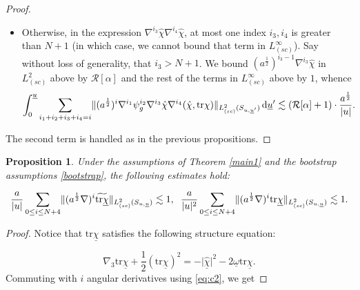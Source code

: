\documentclass{amsart}
\newtheorem{proposition}{Proposition}[section]
\newcommand{\aln}{(\al \nabla)^i}
\newcommand{\omegabar}{\underline{\omega}}
\newcommand{\dubarprime}{\hspace{.5mm} \text{d} \ubar^{\prime}}
\newcommand{\intubar}{\int_0^{\ubar}}
\newcommand{\chihat}{\hat{\chi}}
\newcommand{\al}{a^{\frac{1}{2}}}
\newcommand{\chibar}{\underline{\chi}}
\newcommand{\chibarhat}{\underline{\hat{\chi}}}
\newcommand{\ubar}{\underline{u}}
\newcommand{\scaleinfinitySu}[1]{\lVert{#1} \rVert_{L^\infty_{(sc)}(S_{u,\ubar})}}
\newcommand{\tildetr}{\widetilde{\tr \chibar}}
\newcommand{\scaletwoSu}[1]{\lVert{#1} \rVert_{L^2_{(sc)}(S_{u,\ubar})}}
\newcommand{\scaletwoSuubarprime}[1]{\lVert{#1} \rVert_{L^2_{(sc)}(S_{u,\ubar^\prime})}}
\newcommand{\tr}{\mbox{tr}}
\begin{document}
{\begin{proof}
\begin{itemize}
    
    \[   \intubar\sum_{i_1+i_2+i_3+i_4=i} \scaletwoSuubarprime{(\al)^i\nabla^{i_1}\psi_g^{i_2}\nabla^{i_3}\chihat \nabla^{i_4}(\chihat, \tr\chi)} \dubarprime \lesssim \frac{\scaleinfinitySu{\aln \chihat}^2}{\lvert u \rvert}  \lesssim \frac{1}{a|u|}.    \]
    \item Otherwise, in the expression $\nabla^{i_3}\chihat \nabla^{i_4}\chihat$, at most one index $i_3, i_4$ is greater than $N+1$ (in which case, we cannot bound that term in $L^{\infty}_{(sc)}$). Say without loss of generality, that $i_3>N+1$. We bound $(\al)^{i_3-1}\nabla^{i_3}\chihat$ in $L^2_{(sc)}$ above by $\mathcal{R}[\alpha]$ and the rest of the terms in $L^{\infty}_{(sc)}$ above by $1$, whence     \[   \intubar\sum_{i_1+i_2+i_3+i_4=i} \scaletwoSuubarprime{(\al)^i\nabla^{i_1}\psi_g^{i_2}\nabla^{i_3}\chihat \nabla^{i_4}(\chihat, \tr\chi)} \dubarprime  \lesssim \left(\mathcal{R}[\alpha]+1\right)\cdot\frac{a^{\frac{1}{2}}}{|u|}.    \]
\end{itemize}The second term is handled as in the previous propositions. 


\end{proof}
\begin{proposition}\label{trchibarbound}
Under the assumptions of Theorem \ref{main1} and the bootstrap assumptions \eqref{bootstrap}, the following estimates hold:

\[ \frac{a}{\lvert u \rvert} \sum_{0\leq i \leq N+4} \scaletwoSu{\aln \tildetr} \lesssim 1, \hspace{2mm} \frac{a}{|u|^{2}} \sum_{0\leq i \leq N+4} \scaletwoSu{\aln \tr\chibar} \lesssim 1.\]
\end{proposition}

\begin{proof}
Notice that $\tr\chibar$ satisfies the following structure equation:

\[ \nabla_3 \tr\chibar + \frac{1}{2}(\tr\chibar)^2 = - \lvert \chibarhat \rvert^2 - 2 \omegabar \tr\chibar .\]Commuting with $i$ angular derivatives using \ref{eq:c2}, we get 


\end{proof}}
\end{document}
